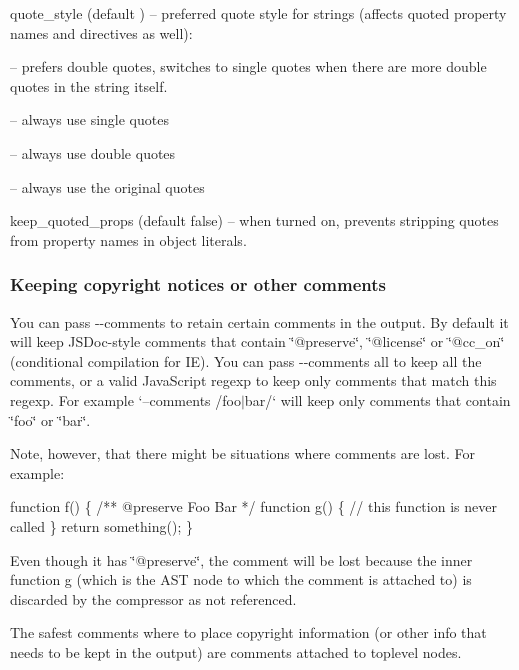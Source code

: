 \begin{DoxyItemize}
\item {\ttfamily quote\+\_\+style} (default {}) -- preferred quote style for strings (affects quoted property names and directives as well)\+:
\begin{DoxyItemize}
\item {} -- prefers double quotes, switches to single quotes when there are more double quotes in the string itself.
\item {} -- always use single quotes
\item {} -- always use double quotes
\item {} -- always use the original quotes
\end{DoxyItemize}
\item {\ttfamily keep\+\_\+quoted\+\_\+props} (default {\ttfamily false}) -- when turned on, prevents stripping quotes from property names in object literals.
\end{DoxyItemize}

\subsubsection*{Keeping copyright notices or other comments}

You can pass {\ttfamily -\/-\/comments} to retain certain comments in the output. By default it will keep J\+S\+Doc-\/style comments that contain \char`\"{}@preserve\char`\"{}, \char`\"{}@license\char`\"{} or \char`\"{}@cc\+\_\+on\char`\"{} (conditional compilation for IE). You can pass {\ttfamily -\/-\/comments all} to keep all the comments, or a valid Java\+Script regexp to keep only comments that match this regexp. For example `--comments \textquotesingle{}/foo$\vert$bar/\textquotesingle{}` will keep only comments that contain \char`\"{}foo\char`\"{} or \char`\"{}bar\char`\"{}.

Note, however, that there might be situations where comments are lost. For example\+: 
\begin{DoxyCode}
function f() \{
    /** @preserve Foo Bar */
    function g() \{
      // this function is never called
    \}
    return something();
\}
\end{DoxyCode}


Even though it has \char`\"{}@preserve\char`\"{}, the comment will be lost because the inner function {\ttfamily g} (which is the A\+ST node to which the comment is attached to) is discarded by the compressor as not referenced.

The safest comments where to place copyright information (or other info that needs to be kept in the output) are comments attached to toplevel nodes.

